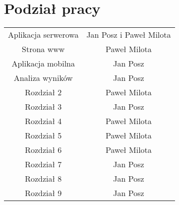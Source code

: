\chapter*{Podział pracy}
\label{cha:podzial_prac}

\begin{center}
\begin{tabular}{ |c|c| } 
 \hline
 Aplikacja serwerowa & Jan Posz i Paweł Milota \\ 
 Strona www & Paweł Milota \\ 
 Aplikacja mobilna & Jan Posz \\ 
 Analiza wyników & Jan Posz \\
 Rozdział 2 & Paweł Milota \\ 
 Rozdział 3 & Jan Posz \\ 
 Rozdział 4 & Paweł Milota \\
 Rozdział 5 & Paweł Milota \\
 Rozdział 6 & Paweł Milota \\
 Rozdział 7 & Jan Posz \\
 Rozdział 8 & Jan Posz \\
 Rozdział 9 & Jan Posz \\
 \hline
\end{tabular}
\end{center}